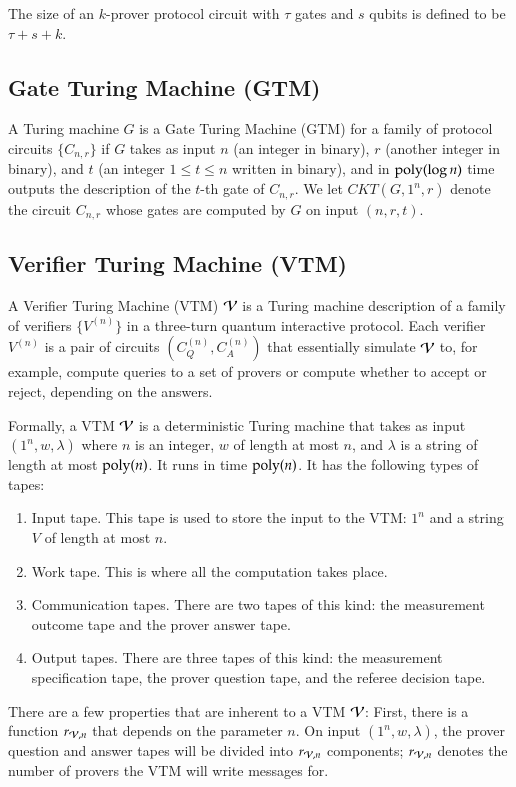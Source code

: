 The size of an $k$-prover protocol circuit with $\tau$ gates and $s$ qubits is defined to be $\tau + s + k$.


\subsection{Gate Turing Machine (GTM)} 
A Turing machine $G$ is a Gate Turing Machine (GTM) for a family of protocol circuits $\{C_{n,r}\}$ if $G$ takes as input $n$ (an integer in binary), $r$ (another integer in binary), and $t$ (an integer $1\leq t\leq n$ written in binary), and in $\operatorname{poly}(\log n)$ time outputs the description of the $t$-th gate of $C_{n,r}$. We let $CKT(G,1^n,r)$ denote the circuit $C_{n,r}$ whose gates are computed by $G$ on input $(n,r,t)$.

\subsection{Verifier Turing Machine (VTM)} 
\label{sec:vtm}

A Verifier Turing Machine (VTM) $\mathcal V$ is a Turing machine description of a family of verifiers $\{V^{(n)}\}$ in a three-turn quantum interactive protocol. Each verifier $V^{(n)}$ is a pair of circuits $(C_Q^{(n)},C_A^{(n)})$ that essentially simulate $\mathcal V$ to, for example, compute queries to a set of provers or compute whether to accept or reject, depending on the answers.

Formally, a VTM $\mathcal V$ is a deterministic Turing machine that takes as input $(1^n,w,\lambda)$ where $n$ is an integer, $w$ of length at most $n$, and $\lambda$ is a string of length at most $\operatorname{poly}(n)$. It runs in time $\operatorname{poly}(n)$.  It has the following types of tapes:
\begin{enumerate}
	\item Input tape. This tape is used to store the input to the VTM: $1^n$ and a string $V$ of length at most $n$. 
	\item Work tape. This is where all the computation takes place.
	\item Communication tapes. There are two tapes of this kind: the measurement outcome tape and the prover answer tape. 
	\item Output tapes. There are three tapes of this kind: the measurement specification tape, the prover question tape, and the referee decision tape. 
\end{enumerate}
There are a few properties that are inherent to a VTM $\mathcal V$: First, there is a function $r_{\mathcal V,n}$ that depends on the parameter $n$. On input $(1^n,w,\lambda)$, the prover question and answer tapes will be divided into $r_{\mathcal V,n}$ components; $r_{\mathcal V,n}$ denotes the number of provers the VTM will write messages for. 

